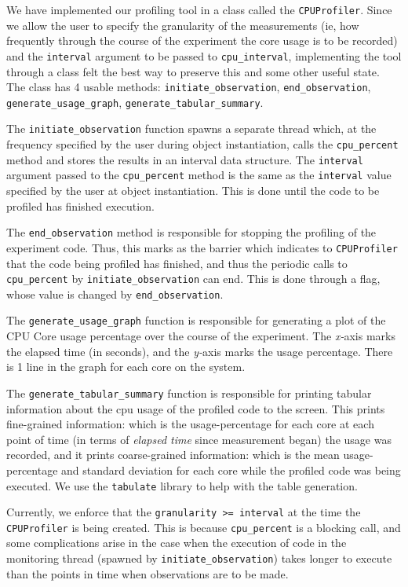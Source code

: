 \documentclass[a4paper,12pt]{article}
\begin{document}
We have implemented our profiling tool in a class called the \verb|CPUProfiler|. Since we allow the user to specify the granularity of the measurements (ie, how frequently through the course of the experiment the core usage is to be recorded) and the \verb|interval| argument to be passed to \verb|cpu_interval|, implementing the tool through a class felt the best way to preserve this and some other useful state. The class has 4 usable methods: \verb|initiate_observation|, \verb|end_observation|, \verb|generate_usage_graph|, \verb|generate_tabular_summary|.

The \verb|initiate_observation| function spawns a separate thread which, at the frequency specified by the user during object instantiation, calls the \verb|cpu_percent| method and stores the results in an interval data structure. The \verb|interval| argument passed to the \verb|cpu_percent| method is the same as the \verb|interval| value specified by the user at object instantiation. This is done until the code to be profiled has finished execution. 

The \verb|end_observation| method is responsible for stopping the profiling of the experiment code. Thus, this marks as the barrier which indicates to \verb|CPUProfiler| that the code being profiled has finished, and thus the periodic calls to \verb|cpu_percent| by \verb|initiate_observation| can end. This is done through a flag, whose value is changed by \verb|end_observation|.

The \verb|generate_usage_graph| function is responsible for generating a plot of the CPU Core usage percentage over the course of the experiment. The \textit{x-}axis marks the elapsed time (in seconds), and the \textit{y-}axis marks the usage percentage. There is 1 line in the graph for each core on the system.

The \verb|generate_tabular_summary| function is responsible for printing tabular information about the cpu usage of the profiled code to the screen. This prints fine-grained information: which is the usage-percentage for each core at each point of time (in terms of \textit{elapsed time} since measurement began) the usage was recorded, and it prints coarse-grained information: which is the mean usage-percentage and standard deviation for each core while the profiled code was being executed. We use the \verb|tabulate| library to help with the table generation. 

Currently, we enforce that the \verb|granularity >= interval| at the time the \verb|CPUProfiler| is being created. This is because \verb|cpu_percent| is a blocking call, and some complications arise in the case when the execution of code in the monitoring thread (spawned by \verb|initiate_observation|) takes longer to execute than the points in time when observations are to be made. 
\end{document}
